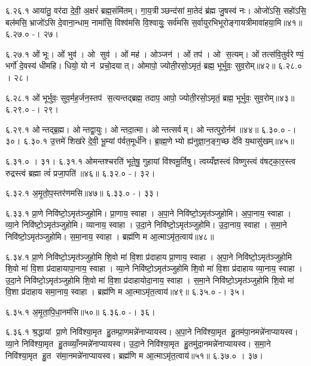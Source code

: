 ६.२६.१
आया॑तु॒ वर॑दा दे॒वी॒ अ॒क्षरं॑ ब्रह्म॒संमि॑तम्। गा॒य॒त्रीञ्छन्द॑सां मा॒तेदं ब्र॑ह्म जु॒षस्व॑ नः। ओजो॑ऽसि॒ सहो॑ऽसि॒ बल॑मसि॒ भ्राजो॑ऽसि दे॒वाना॒न्धाम॒ नामा॑सि॒ विश्व॑मसि वि॒श्वायुः॒ सर्व॑मसि स॒र्वायुरभिभूरोङ्गायत्रीमावा॑हया॒मि॥४१॥
६.२७.०
-। २७।
\anuvakamend

६.२७.१
ओं भूः। ओं भुव॑। ओ सुव॑। ओं मह॑। ओञ्जन॑। ओं तप॑। ओ स॒त्यम्। ओं तत्स॑वि॒तुर्वरेण्यं॒ भर्गो॑ दे॒वस्य॑ धीमहि। धियो॒ यो न॑ प्रचो॒दयात्। ओमापो॒ ज्योती॒रसो॒ऽमृतं॒ ब्रह्म॒ भूर्भुवः॒ सुव॒रोम्॥४२॥
६.२८.०
। २८।
\anuvakamend

६.२८.१
ओं भूर्भुवः॒ सुव॒र्मह॒र्जन॒स्तप॑ स॒त्यन्तद्ब्रह्म॒ तदाप॒ आपो॒ ज्योती॒रसो॒ऽमृतं॒ ब्रह्म॒ भूर्भुवः॒ सुव॒रोम्॥४३॥
६.२९.०
-। २९।
\anuvakamend

६.२९.१
ओन्तद्ब्र॒ह्म। ओन्तद्वा॒युः। ओन्तदा॒त्मा। ओन्तत्सर्वम्। ओन्तत्पुरो॒र्नम॑॥४४॥
६.३०.०
-। ३०।
६.३०.१
उ॒त्तमे॑ शिख॑रे दे॒वी॒ भू॒म्यां प॑र्वत॒मूर्ध॑नि। ब्रा॒ह्म॒णेभ्यो ह्य॑नुज्ञा॒न॒ङ्ग॒च्छ दे॑वि य॒थासु॑खम्॥४५॥
\anuvakamend

६.३१.०
। ३१।
६.३१.१
ओमन्तश्चरति॑ भूते॒षु॒ गुहायां वि॑श्वमू॒र्तिषु। त्वय्यँज्ञस्त्वं  विष्णुस्त्वं व॑षट्का॒र॒स्त्व रुद्रस्त्वं ब्रह्मा त्वं॑ प्रजा॒पति॑॥४६॥
६.३२.०
-। ३२।
\anuvakamend

६.३२.१
अ॒मृ॒तो॒प॒स्तर॑णमसि॥४७॥
६.३३.०
-। ३३।
\anuvakamend

६.३३.१
प्रा॒णे निवि॑ष्टो॒ऽमृत॑ञ्जुहोमि। प्रा॒णाय॒ स्वाहा। अ॒पा॒ने निवि॑ष्टो॒ऽमृत॑ञ्जुहोमि। अ॒पा॒नाय॒ स्वाहा। व्या॒ने निवि॑ष्टो॒ऽमृत॑ञ्जुहोमि। व्यानाय॒ स्वाहा। उ॒दा॒ने निवि॑ष्टो॒ऽमृत॑ञ्जुहोमि। उ॒दा॒नाय॒ स्वाहा। स॒मा॒ने निवि॑ष्टो॒ऽमृत॑ञ्जुहोमि। स॒मा॒नाय॒ स्वाहा। ब्रह्म॑णि म आ॒त्माऽमृ॑त॒त्वाय॑॥४८॥
\anuvakamend

६.३४.१
प्रा॒णे निवि॑ष्टो॒ऽमृत॑ञ्जुहोमि शि॒वो मा॑ वि॒शा प्र॑दाहाय प्रा॒णाय॒ स्वाहा। अ॒पा॒ने निवि॑ष्टो॒ऽमृत॑ञ्जुहोमि शि॒वो मा॑ वि॒शा प्र॑दाहायापा॒नाय॒ स्वाहा। व्या॒ने निवि॑ष्टो॒ऽमृत॑ञ्जुहोमि शि॒वो मा॑ वि॒शा प्र॑दाहाय व्या॒नाय॒ स्वाहा। उ॒दा॒ने निवि॑ष्टो॒ऽमृत॑ञ्जुहोमि शि॒वो मा॑ वि॒शा प्र॑दाहायोदा॒नाय॒ स्वाहा। स॒मा॒ने निवि॑ष्टो॒ऽमृत॑ञ्जुहोमि शि॒वो मा॑ वि॒शा प्र॑दाहाय समा॒नाय॒ स्वाहा। ब्रह्म॑णि म आ॒त्माऽमृ॑त॒त्वाय॑॥४९॥
६.३५.०
-। ३५।
\anuvakamend

६.३५.१
अ॒मृ॒ता॒पि॒धा॒नम॑सि॥५०॥
६.३६.०
-। ३६।
\anuvakamend

६.३६.१
श्र॒द्धायां प्रा॒णे निवि॑श्या॒मृत हु॒तम्प्रा॒णमन्ने॑नाप्यायस्व। अ॒पा॒ने निवि॑श्या॒मृत हु॒तम॑पा॒नमन्ने॑नाप्यायस्व। व्या॒ने निवि॑श्या॒मृत हु॒तव्व्याँ॒नमन्ने॑नाप्यायस्व। उ॒दा॒ने निवि॑श्या॒मृत हु॒तमु॑दा॒नमन्ने॑नाप्यायस्व। स॒मा॒ने निवि॑श्या॒मृत हु॒त स॑मा॒नमन्ने॑नाप्यायस्व। ब्रह्म॑णि म आ॒त्माऽमृ॑त॒त्वाय॑॥५१॥
६.३७.०
। ३७।
\anuvakamend

